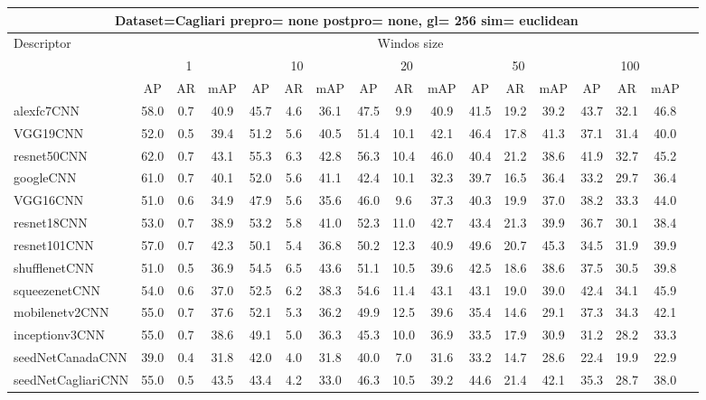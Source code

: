 \documentclass[12pt,italian]{article}
\begin{document}
\small
\begin{longtable}{lcccccccccccccccc}
\toprule
\multicolumn{16}{c}{Dataset=Cagliari prepro= none postpro= none, gl= 256 sim= euclidean} \\ 
\toprule
Descriptor & \multicolumn{15}{c}{Windos size} \\ 
& \multicolumn{3}{c}{1} & \multicolumn{3}{c}{10} & \multicolumn{3}{c}{20} & \multicolumn{3}{c}{50} & \multicolumn{3}{c}{100} \\ 
& AP & AR & mAP & AP & AR & mAP & AP & AR & mAP & AP & AR & mAP & AP & AR & mAP \\ 
\midrule
alexfc7CNN & 58.0 &  0.7 & 40.9 & 45.7 &  4.6 & 36.1 & 47.5 &  9.9 & 40.9 & 41.5 & 19.2 & 39.2 & 43.7 & 32.1 & 46.8 \\ 
VGG19CNN & 52.0 &  0.5 & 39.4 & 51.2 &  5.6 & 40.5 & 51.4 & 10.1 & 42.1 & 46.4 & 17.8 & 41.3 & 37.1 & 31.4 & 40.0 \\ 
resnet50CNN & 62.0 &  0.7 & 43.1 & 55.3 &  6.3 & 42.8 & 56.3 & 10.4 & 46.0 & 40.4 & 21.2 & 38.6 & 41.9 & 32.7 & 45.2 \\ 
googleCNN & 61.0 &  0.7 & 40.1 & 52.0 &  5.6 & 41.1 & 42.4 & 10.1 & 32.3 & 39.7 & 16.5 & 36.4 & 33.2 & 29.7 & 36.4 \\ 
VGG16CNN & 51.0 &  0.6 & 34.9 & 47.9 &  5.6 & 35.6 & 46.0 &  9.6 & 37.3 & 40.3 & 19.9 & 37.0 & 38.2 & 33.3 & 44.0 \\ 
resnet18CNN & 53.0 &  0.7 & 38.9 & 53.2 &  5.8 & 41.0 & 52.3 & 11.0 & 42.7 & 43.4 & 21.3 & 39.9 & 36.7 & 30.1 & 38.4 \\ 
resnet101CNN & 57.0 &  0.7 & 42.3 & 50.1 &  5.4 & 36.8 & 50.2 & 12.3 & 40.9 & 49.6 & 20.7 & 45.3 & 34.5 & 31.9 & 39.9 \\ 
shufflenetCNN & 51.0 &  0.5 & 36.9 & 54.5 &  6.5 & 43.6 & 51.1 & 10.5 & 39.6 & 42.5 & 18.6 & 38.6 & 37.5 & 30.5 & 39.8 \\ 
squeezenetCNN & 54.0 &  0.6 & 37.0 & 52.5 &  6.2 & 38.3 & 54.6 & 11.4 & 43.1 & 43.1 & 19.0 & 39.0 & 42.4 & 34.1 & 45.9 \\ 
mobilenetv2CNN & 55.0 &  0.7 & 37.6 & 52.1 &  5.3 & 36.2 & 49.9 & 12.5 & 39.6 & 35.4 & 14.6 & 29.1 & 37.3 & 34.3 & 42.1 \\ 
inceptionv3CNN & 55.0 &  0.7 & 38.6 & 49.1 &  5.0 & 36.3 & 45.3 & 10.0 & 36.9 & 33.5 & 17.9 & 30.9 & 31.2 & 28.2 & 33.3 \\ 
seedNetCanadaCNN & 39.0 &  0.4 & 31.8 & 42.0 &  4.0 & 31.8 & 40.0 &  7.0 & 31.6 & 33.2 & 14.7 & 28.6 & 22.4 & 19.9 & 22.9 \\ 
seedNetCagliariCNN & 55.0 &  0.5 & 43.5 & 43.4 &  4.2 & 33.0 & 46.3 & 10.5 & 39.2 & 44.6 & 21.4 & 42.1 & 35.3 & 28.7 & 38.0 \\ 
\bottomrule
\end{longtable} 
\end{document}
